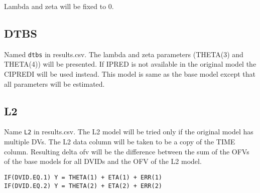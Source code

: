 Lambda and zeta will be fixed to 0.

\subsection{DTBS}
Named \verb|dtbs| in results.csv. The lambda and zeta parameters (THETA(3) and THETA(4)) will be presented. If IPRED is not available in the original model the CIPREDI will be used instead. This model is same as the base model except that all parameters will be estimated.

\subsection{L2}
Name \verb|L2| in results.csv. The L2 model will be tried only if the original model has multiple DVs. The L2 data column will be taken to be a copy of the TIME column. Resulting delta ofv will be the difference between the sum of the OFVs of the base models for all DVIDs and the OFV of the L2 model.
\begin{verbatim}
IF(DVID.EQ.1) Y = THETA(1) + ETA(1) + ERR(1)
IF(DVID.EQ.2) Y = THETA(2) + ETA(2) + ERR(2)
\end{verbatim}


